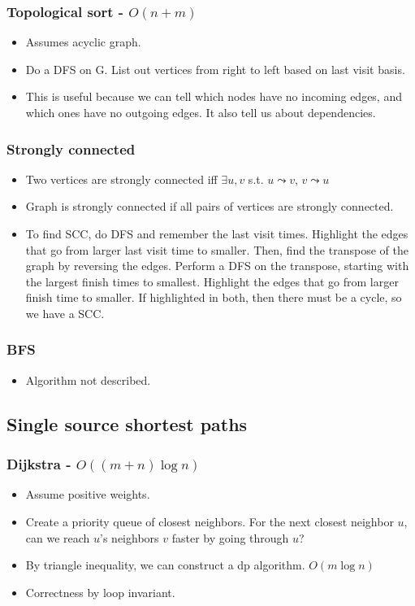 \subsubsection{Topological sort - $O(n+m)$}
\begin{itemize}
    \item Assumes acyclic graph.
    \item Do a DFS on G. List out vertices from right to left based on last visit basis.
    \item This is useful because we can tell which nodes have no incoming edges, and which ones have no outgoing edges. It also tell us about dependencies.
\end{itemize}
\subsubsection{Strongly connected}
\begin{itemize}
    \item Two vertices are strongly connected iff $\exists u, v$ s.t. $u\leadsto v$, $v\leadsto u$
    \item Graph is strongly connected if all pairs of vertices are strongly connected.
    \item To find SCC, do DFS and remember the last visit times. Highlight the edges that go from larger last visit time to smaller. Then, find the transpose of the graph by reversing the edges. Perform a DFS on the transpose, starting with the largest finish times to smallest. Highlight the edges that go from larger finish time to smaller. If highlighted in both, then there must be a cycle, so we have a SCC.
\end{itemize}
\subsubsection{BFS}
\begin{itemize}
    \item Algorithm not described.
\end{itemize}
\subsection{Single source shortest paths}
\subsubsection{Dijkstra - $O((m+n)\log n)$}
\begin{itemize}
    \item Assume positive weights.
    \item Create a priority queue of closest neighbors. For the next closest neighbor $u$, can we reach $u$'s neighbors $v$ faster by going through $u$?
    \item By triangle inequality, we can construct a dp algorithm. $O(m\log n)$
    \item Correctness by loop invariant.
\end{itemize}
